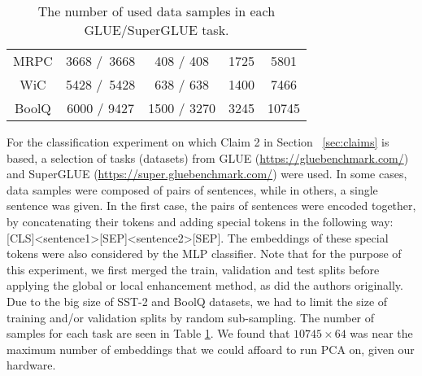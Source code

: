 \begin{table}[!htb]
\begin{minipage}{.50\linewidth}
\begin{tabular}{c|ccc||c}
MRPC  & 3668 /~3668                                                       & 408 / 408                                                              & 1725                         & 5801                                                   \\
WiC   & 5428 /~5428                                                       & 638 / 638                                                              & 1400                         & 7466                                                   \\
BoolQ & \textcolor[rgb]{0.502,0,0}{6000 }/ 9427                           & \textcolor[rgb]{0.502,0,0}{1500 }/ 3270                                & 3245                         & 10745                            \\
\hline
\end{tabular}
\caption{The number of used data samples in each GLUE/SuperGLUE task.}
\label{tab:glue}
    \end{minipage} 
\end{table}






For the classification experiment on which Claim 2 in Section ~\ref{sec:claims} is based, a selection of tasks (datasets) from GLUE \cite{glue} (\url{https://gluebenchmark.com/}) and SuperGLUE \cite{superglue} (\url{https://super.gluebenchmark.com/}) were used. In some cases, data samples were composed of pairs of sentences, while in others, a single sentence was given. In the first case, the pairs of sentences were encoded together, by concatenating their tokens and adding special tokens in the following way: [CLS]<sentence1>[SEP]<sentence2>[SEP]. The embeddings of these special tokens were also considered by the MLP classifier. Note that for the purpose of this experiment, we first merged the train, validation and test splits before applying the global or local enhancement method, as did the authors originally. Due to the big size of SST-2 and BoolQ datasets, we had to limit the size of training and/or validation splits by random sub-sampling. The number of samples for each task are seen in Table \ref{tab:glue}. We found that $10745 \times 64$ was near the maximum number of embeddings that we could affoard to run PCA on, given our hardware.


